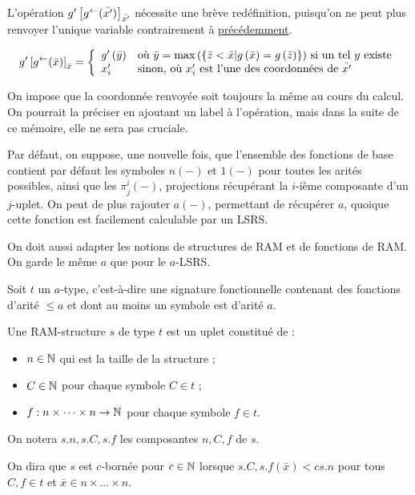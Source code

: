 		\begin{remark}
			L'opération $g'\left[ g^{\leftarrow}(\bar{x'}) \right]_{\bar{x'}}$ nécessite une brève redéfinition, puisqu'on ne peut plus renvoyer l'unique variable contrairement à \hyperref[def:app_bornee_eq_pred]{précédemment}. 
			
			\[
				g'\left[ g^{\leftarrow}(\bar{x}) \right]_{\bar{x}} = \left\lbrace \begin{array}{ll} 
												g'\left( \bar{y} \right) & \text{où $\bar{y} = \max\left( \left\lbrace \bar{z} < \bar{x} | g\left( \bar{x} \right) = g\left( \bar{z} \right) \right\rbrace \right)$ si un tel $y$ existe} \\
												x'_i & \text{sinon, où $x'_i$ est l'une des coordonnées de $\bar{x'}$}
											 \end{array} \right.
			\]
			
			On impose que la coordonnée renvoyée soit toujours la même au cours du calcul. On pourrait la préciser en ajoutant un label à l'opération, mais dans la suite de ce mémoire, elle ne sera pas cruciale.
		\end{remark}
		
		\begin{remark}
			\label{rk:fonctions_de_base_LSRS}
			Par défaut, on suppose, une nouvelle fois, que l'ensemble des fonctions de base contient par défaut les symboles $n(-)$ et $1(-)$ pour toutes les arités possibles, ainsi que les $\pi^i_j(-)$, projections récupérant la $i$-ième composante d'un $j$-uplet. On peut de plus rajouter $a(-)$, permettant de récupérer $a$, quoique cette fonction est facilement calculable par un LSRS.
		\end{remark}
		
		On doit aussi adapter les notions de structures de RAM et de fonctions de RAM. On garde le même $a$ que pour le $a$-LSRS.
		
		\begin{definition}
			\label{def:RAM_data_structures_a}
			Soit $t$ un $a$-type, c'est-à-dire une signature fonctionnelle contenant des fonctions d'arité $\leqslant a$ et dont au moins un symbole est d'arité $a$. 
			
			Une RAM-structure $s$ de type $t$ est un uplet constitué de :
			\begin{itemize}[itemsep=-1mm]
				\item 	$n \in \mathbb{N}$ qui est la taille de la structure ;
				\item 	$C \in \mathbb{N}$ pour chaque symbole $C \in t$ ;
				\item 	$f : n\times \dots \times n \to \mathbb{N}$ pour chaque symbole $f \in t$.
			\end{itemize}
			
			On notera $s.n, s.C, s.f$ les composantes $n, C, f$ de $s$.
			
			On dira que $s$ est $c$-bornée pour $c\in\mathbb{N}$ lorsque $s.C, s.f\left(\bar{x}\right) < c s.n$ pour tous $C, f \in t$ et $\bar{x} \in n\times \dots \times n$.
		\end{definition}
		
